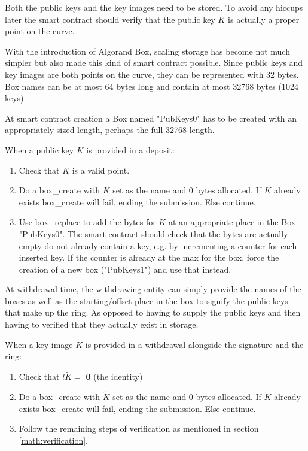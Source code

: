 \documentclass[9pt]{article}
\begin{document}
Both the public keys and the key images need to be stored. To avoid any hiccups later the smart contract should verify that the public key $K$ is actually a proper point on the curve.

With the introduction of Algorand Box, scaling storage has become not much simpler but also made this kind of smart contract possible. Since public keys and key images are both points on the curve, they can be represented with 32 bytes. Box names can be at most 64 bytes long and contain at most 32768 bytes (1024 keys).

At smart contract creation a Box named "PubKeys0" has to be created with an appropriately sized length, perhaps the full 32768 length.

When a public key $K$ is provided in a deposit:
\begin{enumerate}
    \item Check that $K$ is a valid point.
    \item Do a box\_create with $K$ set as the name and 0 bytes allocated. If $K$ already exists box\_create will fail, ending the submission. Else continue.
    \item Use box\_replace to add the bytes for $K$ at an appropriate place in the Box "PubKeys0". The smart contract should check that the bytes are actually empty do not already contain a key, e.g. by incrementing a counter for each inserted key. If the counter is already at the max for the box, force the creation of a new box ("PubKeys1") and use that instead.
\end{enumerate}

At withdrawal time, the withdrawing entity can simply provide the names of the boxes as well as the starting/offset place in the box to signify the public keys that make up the ring. As opposed to having to supply the public keys and then having to verified that they actually exist in storage.

When a key image $\tilde{K}$ is provided in a withdrawal alongside the signature and the ring:
\begin{enumerate}
    \item Check that $l\tilde{K} =$ \textbf{0} (the identity)
    \item Do a box\_create with $\tilde{K}$ set as the name and 0 bytes allocated. If $\tilde{K}$ already exists box\_create will fail, ending the submission. Else continue.
    \item Follow the remaining steps of verification as mentioned in section \ref{math:verification}.
\end{enumerate}
\end{document}
